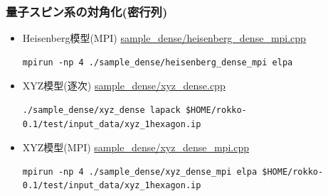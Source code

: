 \begin{frame}[c,fragile]
  \frametitle{量子スピン系の対角化(密行列)}
  \begin{itemize}
  \item Heisenberg模型(MPI) \href{https://github.com/t-sakashita/rokko/blob/master/sample_dense/heisenberg_dense_mpi.cpp}{sample\_dense/heisenberg\_dense\_mpi.cpp}
\begin{lstlisting}[style=shstyle]
mpirun -np 4 ./sample_dense/heisenberg_dense_mpi elpa
\end{lstlisting}
  \item XYZ模型(逐次) \href{https://github.com/t-sakashita/rokko/blob/master/sample_dense/xyz_dense.cpp}{sample\_dense/xyz\_dense.cpp}
\begin{lstlisting}[style=shstyle]
./sample_dense/xyz_dense lapack $HOME/rokko-0.1/test/input_data/xyz_1hexagon.ip
\end{lstlisting}
  \item XYZ模型(MPI) \href{https://github.com/t-sakashita/rokko/blob/master/sample_dense/xyz_dense_mpi.cpp}{sample\_dense/xyz\_dense\_mpi.cpp}
\begin{lstlisting}
mpirun -np 4 ./sample_dense/xyz_dense_mpi elpa $HOME/rokko-0.1/test/input_data/xyz_1hexagon.ip
\end{lstlisting}
  \end{itemize}
\end{frame}

